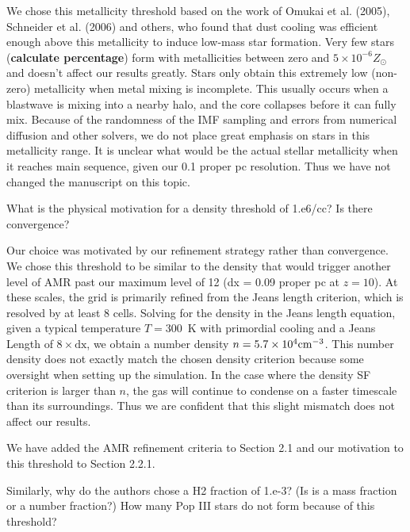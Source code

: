 \documentclass[11pt]{article}
\newenvironment{referee}[1][]{%
    \ignorespaces%
    \begin{mdframed}[style=myquotestyle,#1]%
}{%
    \end{mdframed}%
    \ignorespacesafterend%
}%
\begin{document}
We chose this metallicity threshold based on the work of Omukai et al. (2005), Schneider et al. (2006) and others, who found that dust cooling was efficient enough above this metallicity to induce low-mass star formation.  Very few stars (\textbf{calculate percentage}) form with metallicities between zero and $5 \times 10^{-6} Z_\odot$ and doesn't affect our results greatly.  Stars only obtain this extremely low (non-zero) metallicity when metal mixing is incomplete.  This usually occurs when a blastwave is mixing into a nearby halo, and the core collapses before it can fully mix.  Because of the randomness of the IMF sampling and errors from numerical diffusion and other solvers, we do not place great emphasis on stars in this metallicity range.  It is unclear what would be the actual stellar metallicity when it reaches main sequence, given our 0.1 proper pc resolution.  Thus we have not changed the manuscript on this topic.


\begin{referee}
What is the physical motivation for a density threshold of 1.e6/cc? Is there convergence?
\end{referee}

Our choice was motivated by our refinement strategy rather than convergence. We chose this threshold to be similar to the density that would trigger another level of AMR past our maximum level of 12 (dx = 0.09 proper pc at $z=10$).  At these scales, the grid is primarily refined from the Jeans length criterion, which is resolved by at least 8 cells.  Solving for the density in the Jeans length equation, given a typical temperature $T=300$~K with primordial cooling and a Jeans Length of $8 \times \textrm{dx}$, we obtain a number density $n = 5.7 \times 10^4 \cubecm$.  This number density does not exactly match the chosen density criterion because some oversight when setting up the simulation.  In the case where the density SF criterion is larger than $n$, the gas will continue to condense on a faster timescale than its surroundings.  Thus we are confident that this slight mismatch does not affect our results.

We have added the AMR refinement criteria to Section 2.1 and our motivation to this threshold to Section 2.2.1.

\begin{referee}
Similarly, why do the authors chose a H2 fraction of 1.e-3? (Is is a mass fraction or a number fraction?) How many Pop III stars do not form because of this threshold?
\end{referee}
\end{document}
